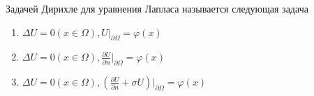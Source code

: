 Задачей Дирихле для уравнения Лапласа называется следующая задача

\begin{enumerate}[label=\arabic*)]
    \item \(\Delta U =0 ( x \in \Omega ), U\vert _{\partial \Omega }=\varphi (x)\)
    \item \(\Delta U =0 ( x \in \Omega ), \frac{\partial U}{\partial n}\vert _{\partial \Omega }=\varphi (x)\)
    \item \(\Delta U =0 ( x\in \Omega ), (\frac{\partial U}{\partial n}+\sigma U)\vert _{\partial \Omega }=\varphi (x)\)
\end{enumerate}

